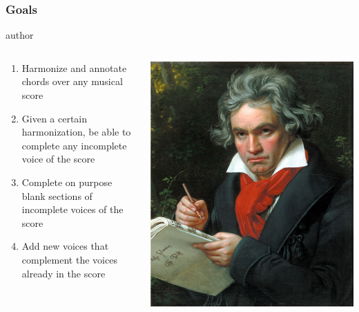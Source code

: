 \documentclass[english]{beamer}
\begin{document}
	\begin{frame}
		\frametitle{Goals}
			\begin{beamercolorbox}[leftskip=8cm,center,wd=0.7\textwidth]{author}
			\begin{columns}[T]
			\begin{column}{.60\textwidth}%
				\begin{enumerate}
							\item Harmonize and annotate chords over any musical score
							\item Given a certain harmonization, be able to complete any incomplete voice of the score
							\item Complete on purpose blank sections of incomplete voices of the score
							\item Add new voices that complement the voices already in the score
						\end{enumerate}
			\end{column}
			\begin{column}{.39\textwidth}%
			\includegraphics[width=\linewidth]{imagenes/Beethoven.jpg}
			\end{column}
			\end{columns}
			\end{beamercolorbox}
	\end{frame}
\end{document}
